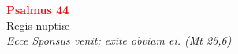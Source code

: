 


\def\greinitialformat#1{%
{\fontsize{39}{39}\selectfont #1}%
}




\vspace{0.3cm}
\begin{center}
 \textcolor{red}{\large \bf Psalmus 44}\\
Regis nuptiæ\\
\textit{\small Ecce Sponsus venit; exite obviam ei. (Mt 25,6)}
\end{center}
